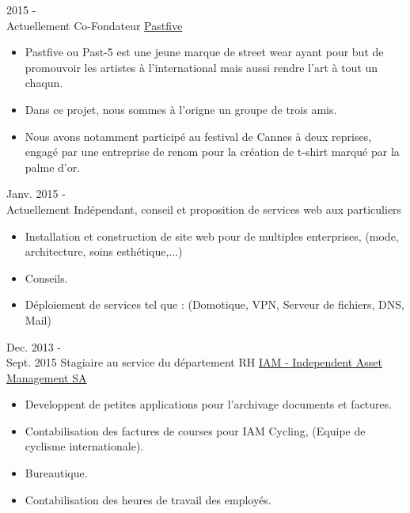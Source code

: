 \documentclass[letterpaper]{twentysecondcv} %
\begin{document}
	\begin{twenty} %
		\twentyitem
		{2015 - \\Actuellement}
		{Co-Fondateur}
		{\href{http://past-5.com/}{Pastfive}}
		{}
		{
			{\begin{itemize}
					\item Pastfive ou Past-5 est une jeune marque de street wear ayant pour but de promouvoir les artistes à l'international mais aussi rendre l'art à tout un chaqun.
					\item Dans ce projet, nous sommes à l'origne un groupe de trois amis.
					\item Nous avons notamment participé au festival de Cannes à deux reprises, engagé par une entreprise de renom pour la création de t-shirt marqué par la palme d'or.
			\end{itemize}}
		}
		\twentyitem
		{Janv. 2015 - \\ Actuellement}
		{Indépendant, conseil et proposition de services web aux particuliers}
		{}
		{}
		{
			{\begin{itemize}
					\item Installation et construction de site web pour de multiples enterprises, (mode, architecture, soins esthétique,...)
					\item Conseils.
					\item Déploiement de services tel que : (Domotique, VPN, Serveur de fichiers, DNS, Mail)
			\end{itemize}}
		}
		
		\twentyitem
		{Dec. 2013 - \\ Sept. 2015}
		{Stagiaire au service du département RH}
		{\href{https://www.iam.ch/}{IAM - Independent Asset Management SA}}
		{}
		{
			\begin{itemize}
				\item Developpent de petites applications pour l'archivage documents et factures.
				\item Contabilisation des factures de courses pour IAM Cycling, (Equipe de cyclisme internationale).
				\item Bureautique.
				\item Contabilisation des heures de travail des employés.
			\end{itemize}
		}
	\end{twenty}
	\pagebreak
\end{document}
